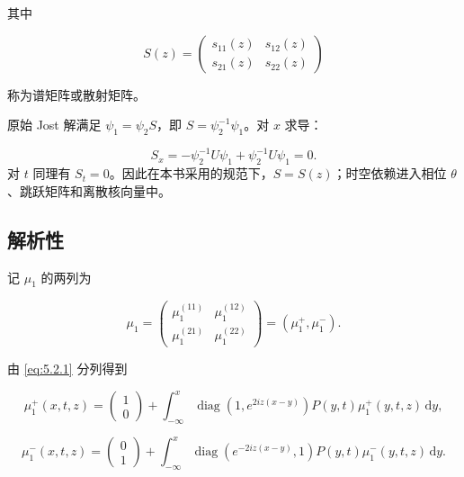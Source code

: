 \documentclass[
    lang=cn,
    scheme=chinese,
    mode=simple,
    device=normal,
    color=blue,
    math=cm,
    thmcnt=section,
    12pt
]{elegantbook}
\begin{document}
其中

\[
    S(z)=
    \begin{pmatrix}
        s_{11}(z) & s_{12}(z) \\
        s_{21}(z) & s_{22}(z)
    \end{pmatrix}
\]

称为谱矩阵或散射矩阵。

\begin{callout}[为什么 $S$ 与 $x,t$ 无关？]
    原始 Jost 解满足 $\psi_1=\psi_2S$，即 $S=\psi_2^{-1}\psi_1$。对 $x$ 求导：

    \[
        S_x
        =
        -\psi_2^{-1}U\psi_1+\psi_2^{-1}U\psi_1
        =0.
    \]
    对 $t$ 同理有 $S_t=0$。因此在本书采用的规范下，$S=S(z)$；时空依赖进入相位 $\theta$、跳跃矩阵和离散核向量中。
\end{callout}

\subsection{解析性}

记 $\mu_1$ 的两列为

\begin{equation}
    \mu_1
    =
    \begin{pmatrix}
        \mu_1^{(11)} & \mu_1^{(12)} \\
        \mu_1^{(21)} & \mu_1^{(22)}
    \end{pmatrix}
    =
    (\mu_1^+,\mu_1^-).
    \tag{5.2.4}
    \label{eq:5.2.4}
\end{equation}

由 \eqref{eq:5.2.1} 分列得到

\begin{equation}
    \mu_1^+(x,t,z)
    =
    \begin{pmatrix}1\\0\end{pmatrix}
    +
    \int_{-\infty}^{x}
    \operatorname{diag}\!\left(1,e^{2iz(x-y)}\right)
    P(y,t)\mu_1^+(y,t,z)\,\mathrm dy,
    \tag{5.2.5}
    \label{eq:5.2.5}
\end{equation}

\begin{equation}
    \mu_1^-(x,t,z)
    =
    \begin{pmatrix}0\\1\end{pmatrix}
    +
    \int_{-\infty}^{x}
    \operatorname{diag}\!\left(e^{-2iz(x-y)},1\right)
    P(y,t)\mu_1^-(y,t,z)\,\mathrm dy.
    \tag{5.2.6}
    \label{eq:5.2.6}
\end{equation}
\end{document}
